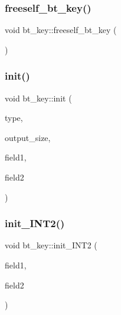 \mbox{\label{classbt__key_aad1f5a9b943d3ae072f1d09a9bb126c6}} 
\subsubsection{\texorpdfstring{freeself\+\_\+bt\+\_\+key()}{freeself\_bt\_key()}}
{\footnotesize\ttfamily void bt\+\_\+key\+::freeself\+\_\+bt\+\_\+key (\begin{DoxyParamCaption}{ }\end{DoxyParamCaption})}

\mbox{\label{classbt__key_ae6b27c89a5f6dec6a7a19583a4b112a8}} 
\subsubsection{\texorpdfstring{init()}{init()}}
{\footnotesize\ttfamily void bt\+\_\+key\+::init (\begin{DoxyParamCaption}\item[{enum \mbox{\hyperlink{discreta_8h_ac90b3b8c242d6128eb9985cfb7f77053}{bt\+\_\+key\+\_\+kind}}}]{type,  }\item[{\mbox{\hyperlink{galois_8h_a09fddde158a3a20bd2dcadb609de11dc}{I\+NT}}}]{output\+\_\+size,  }\item[{\mbox{\hyperlink{galois_8h_a09fddde158a3a20bd2dcadb609de11dc}{I\+NT}}}]{field1,  }\item[{\mbox{\hyperlink{galois_8h_a09fddde158a3a20bd2dcadb609de11dc}{I\+NT}}}]{field2 }\end{DoxyParamCaption})}

\mbox{\label{classbt__key_a588bbf34a0c101ad79f331fc762c36fa}} 
\subsubsection{\texorpdfstring{init\+\_\+\+I\+N\+T2()}{init\_INT2()}}
{\footnotesize\ttfamily void bt\+\_\+key\+::init\+\_\+\+I\+N\+T2 (\begin{DoxyParamCaption}\item[{\mbox{\hyperlink{galois_8h_a09fddde158a3a20bd2dcadb609de11dc}{I\+NT}}}]{field1,  }\item[{\mbox{\hyperlink{galois_8h_a09fddde158a3a20bd2dcadb609de11dc}{I\+NT}}}]{field2 }\end{DoxyParamCaption})}


